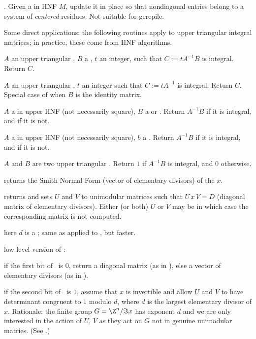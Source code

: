 . Given a  in HNF $M$, update it in
place so that nondiagonal entries belong to a system of \emph{centered}
residues. Not suitable for gerepile.

Some direct applications: the following routines apply to upper triangular
integral matrices; in practice, these come from HNF algorithms.

 $A$ an upper triangular ,
$B$ a , $t$ an integer, such that $C := tA^{-1}B$ is integral.
Return $C$.

 $A$ an upper triangular ,
$t$ an integer such that $C := tA^{-1}$ is integral. Return $C$. Special case
of  when $B$ is the identity matrix.

 $A$ a  in upper HNF (not
necessarily square), $B$ a  or . Return $A^{-1}B$ if it is
integral, and  if it is not.

 $A$ a  in upper HNF
(not necessarily square), $b$ a .  Return $A^{-1}B$ if it is
integral, and  if it is not.

 $A$ and $B$ are two upper triangular
. Return $1$ if $A^{-1} B$ is integral, and $0$ otherwise.


 returns the Smith Normal Form (vector of
elementary divisors) of the  $x$.

 returns
 and sets $U$ and $V$ to unimodular matrices such that $U\,
x\, V = D$ (diagonal matrix of elementary divisors). Either (or both) $U$ or
$V$ may be  in which case the corresponding matrix is not computed.

 here $d$ is a ; same as
 applied to , but faster.

 low level version of
:

\item if the first bit of \fl\ is $0$, return a diagonal matrix (as in
), else a vector of elementary divisors (as in
).

\item if the second bit of \fl\ is $1$, assume that $x$ is invertible
and allow $U$ and $V$ to have determinant congruent to $1$ modulo $d$,
where $d$ is the largest elementary divisor of $x$. Rationale: the finite
group $G = \Z^n/\Im x$ has exponent $d$ and we are only interested
in the action of $U$, $V$ as they act on $G$ not in genuine unimodular
matries. (See .)

